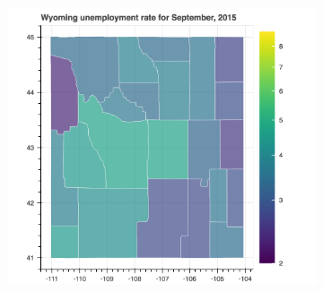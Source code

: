 \documentclass[11pt,letterpaper]{article}
\begin{document}
\begin{figure}[h!]
~
\begin{subfigure}{0.3\textwidth}
\includegraphics[width=1.2\linewidth]{wy_unemp_2015}
\end{subfigure}


\end{figure}
\end{document}
